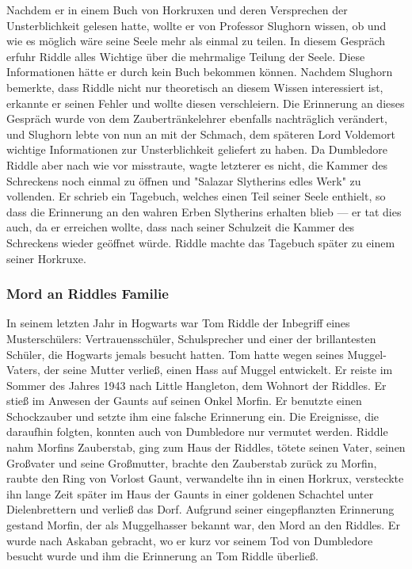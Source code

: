 \documentclass[a4paper, 10pt]{article}
\begin{document}
Nachdem er in einem Buch von Horkruxen und deren Versprechen der Unsterblichkeit gelesen hatte, wollte er von Professor Slughorn wissen, ob und wie es möglich wäre seine Seele mehr als einmal zu teilen. In diesem Gespräch erfuhr Riddle alles Wichtige über die mehrmalige Teilung der Seele. Diese Informationen hätte er durch kein Buch bekommen können. Nachdem Slughorn bemerkte, dass Riddle nicht nur theoretisch an diesem Wissen interessiert ist, erkannte er seinen Fehler und wollte diesen verschleiern. Die Erinnerung an dieses Gespräch wurde von dem Zaubertränkelehrer ebenfalls nachträglich verändert, und Slughorn lebte von nun an mit der Schmach, dem späteren Lord Voldemort wichtige Informationen zur Unsterblichkeit geliefert zu haben.
\vspace{10pt}
\newline
{}  
Da Dumbledore Riddle aber nach wie vor misstraute, wagte letzterer es nicht, die Kammer des Schreckens noch einmal zu öffnen 
und "Salazar Slytherins edles Werk" zu vollenden. Er schrieb ein Tagebuch, welches einen Teil seiner Seele enthielt, so dass die Erinnerung an den wahren Erben Slytherins erhalten blieb — er tat dies auch, da er erreichen wollte, dass nach seiner Schulzeit die Kammer des Schreckens wieder geöffnet würde. Riddle machte das Tagebuch später zu einem seiner Horkruxe.

\subsubsection*{\large Mord an Riddles Familie}
In seinem letzten Jahr in Hogwarts war Tom Riddle der Inbegriff eines Musterschülers: Vertrauensschüler, Schulsprecher und einer der brillantesten Schüler, die Hogwarts jemals besucht hatten.
\vspace{10pt}
\newline
{}  
Tom hatte wegen seines Muggel-Vaters, der seine Mutter verließ, einen Hass auf Muggel entwickelt. Er reiste im Sommer des Jahres 1943 nach Little Hangleton, dem Wohnort der Riddles. Er stieß im Anwesen der Gaunts auf seinen Onkel Morfin. Er benutzte einen Schockzauber und setzte ihm eine falsche Erinnerung ein. Die Ereignisse, die daraufhin folgten, konnten auch von Dumbledore nur vermutet werden. Riddle nahm Morfins Zauberstab, ging zum Haus der Riddles, tötete seinen Vater, seinen Großvater und seine Großmutter, brachte den Zauberstab zurück zu Morfin, raubte den Ring von Vorlost Gaunt, verwandelte ihn in einen Horkrux, versteckte ihn lange Zeit später im Haus der Gaunts in einer goldenen Schachtel unter Dielenbrettern und verließ das Dorf.
\vspace{10pt}
\newline
{}  
Aufgrund seiner eingepflanzten Erinnerung gestand Morfin, der als Muggelhasser bekannt war, den Mord an den Riddles. Er wurde nach Askaban gebracht, wo er kurz vor seinem Tod von Dumbledore besucht wurde und ihm die Erinnerung an Tom Riddle überließ.
\end{document}
